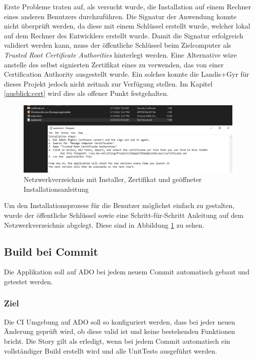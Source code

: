 Erste Probleme traten auf, als versucht wurde, die Installation auf einem Rechner eines anderen Benutzers durchzuführen.
Die Signatur der Anwendung konnte nicht überprüft werden, da diese mit einem Schlüssel erstellt wurde, welcher lokal auf dem Rechner des Entwicklers erstellt wurde.
Damit die Signatur erfolgreich validiert werden kann, muss der öffentliche Schlüssel beim Zielcomputer als \textit{Trusted Root Certificate Authorities} hinterlegt werden.
Eine Alternative wäre anstelle des selbst signierten Zertifikat eines zu verwenden, das von einer Certification Authority ausgestellt wurde.
Ein solches konnte die Landis+Gyr für dieses Projekt jedoch nicht zeitnah zur Verfügung stellen.
Im Kapitel \ref{ausblick:cert} wird dies als offener Punkt festgehalten.

\begin{figure}
   \centering
   \includegraphics[width=1.0\textwidth]{gfx/installer_readme.png}
   \caption{
      Netzwerkverzeichnis mit Installer, Zertifikat und geöffneter Installationsanleitung
      }
      \label{fig:installerreadme}
\end{figure}

Um den Installationsprozess für die Benutzer möglichst einfach zu gestalten, wurde der öffentliche Schlüssel sowie eine Schritt-für-Schritt Anleitung auf dem Netzwerkverzeichnis abgelegt.
Diese sind in Abbildung \ref{fig:installerreadme} zu sehen.


\subsection{Build bei Commit}\label{story_buildoncommit}
\dq Die Applikation soll auf \ac{ADO} bei jedem neuem Commit automatisch gebaut und getestet werden.\dq

\subsubsection{Ziel}
Die \ac{CI} Umgebung auf \ac{ADO} soll so konfiguriert werden, dass bei jeder neuen Änderung geprüft wird, ob diese valid ist und keine bestehenden Funktionen bricht.
Die Story gilt als erledigt, wenn bei jedem Commit automatisch ein vollständiger Build erstellt wird und alle UnitTests ausgeführt werden.

